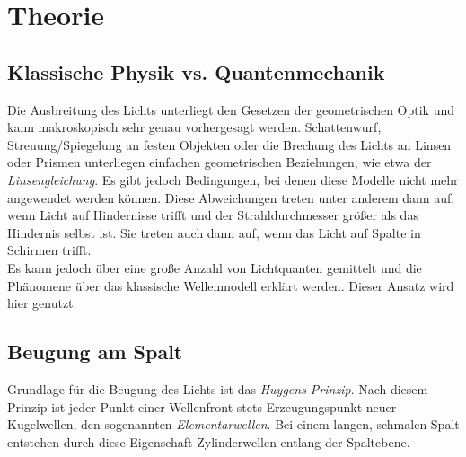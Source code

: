 \section{Theorie}
\label{sec:Theorie}

\subsection{Klassische Physik vs. Quantenmechanik}
Die Ausbreitung des Lichts unterliegt den Gesetzen der geometrischen Optik und kann makroskopisch sehr genau vorhergesagt werden.
Schattenwurf, Streuung/Spiegelung an festen Objekten oder die Brechung des Lichts an Linsen oder Prismen unterliegen einfachen geometrischen Beziehungen, wie etwa der \textit{Linsengleichung}\cite[286]{taschenbuch}.
Es gibt jedoch Bedingungen, bei denen diese Modelle nicht mehr angewendet werden können.
Diese Abweichungen treten unter anderem dann auf, wenn Licht auf Hindernisse trifft und der Strahldurchmesser größer als das Hindernis selbst ist.
Sie treten auch dann auf, wenn das Licht auf Spalte in Schirmen trifft.\\
Es kann jedoch über eine große Anzahl von Lichtquanten gemittelt und die Phänomene über das klassische Wellenmodell erklärt werden.
Dieser Ansatz wird hier genutzt.\\

\subsection{Beugung am Spalt}
Grundlage für die Beugung des Lichts ist das \textit{Huygens-Prinzip}.
Nach diesem Prinzip ist jeder Punkt einer Wellenfront stets Erzeugungspunkt neuer Kugelwellen, den sogenannten \textit{Elementarwellen}.
Bei einem langen, schmalen Spalt entstehen durch diese Eigenschaft Zylinderwellen entlang der Spaltebene.


